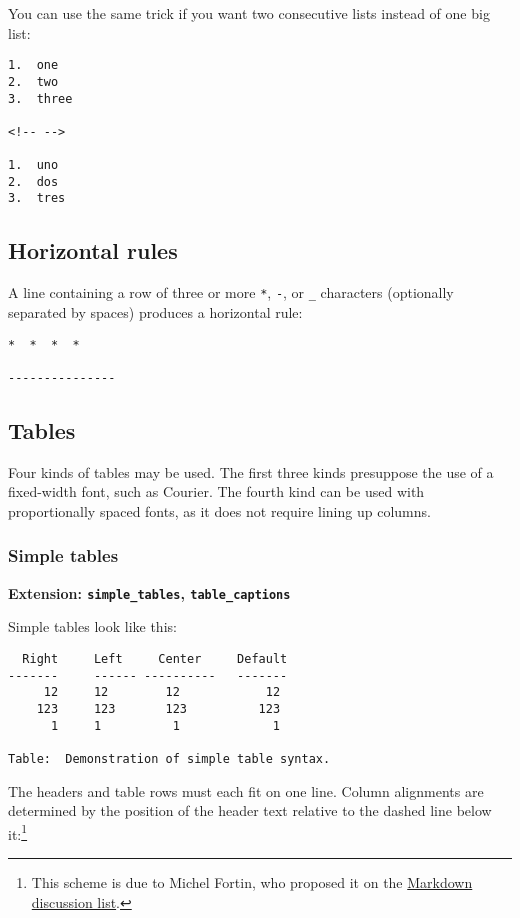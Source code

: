 \documentclass[]{article}
\begin{document}
You can use the same trick if you want two consecutive lists instead of
one big list:

\begin{verbatim}
1.  one
2.  two
3.  three

<!-- -->

1.  uno
2.  dos
3.  tres
\end{verbatim}

\subsection{Horizontal rules}

A line containing a row of three or more \texttt{*}, \texttt{-}, or
\texttt{\_} characters (optionally separated by spaces) produces a
horizontal rule:

\begin{verbatim}
*  *  *  *

---------------
\end{verbatim}

\subsection{Tables}

Four kinds of tables may be used. The first three kinds presuppose the
use of a fixed-width font, such as Courier. The fourth kind can be used
with proportionally spaced fonts, as it does not require lining up
columns.

\subsubsection{Simple tables}

\textbf{Extension: \texttt{simple\_tables}, \texttt{table\_captions}}

Simple tables look like this:

\begin{verbatim}
  Right     Left     Center     Default
-------     ------ ----------   -------
     12     12        12            12
    123     123       123          123
      1     1          1             1

Table:  Demonstration of simple table syntax.
\end{verbatim}

The headers and table rows must each fit on one line. Column alignments
are determined by the position of the header text relative to the dashed
line below it:\footnote{This scheme is due to Michel Fortin, who
  proposed it on the
  \href{http://six.pairlist.net/pipermail/markdown-discuss/2005-March/001097.html}{Markdown
  discussion list}.}
\end{document}
